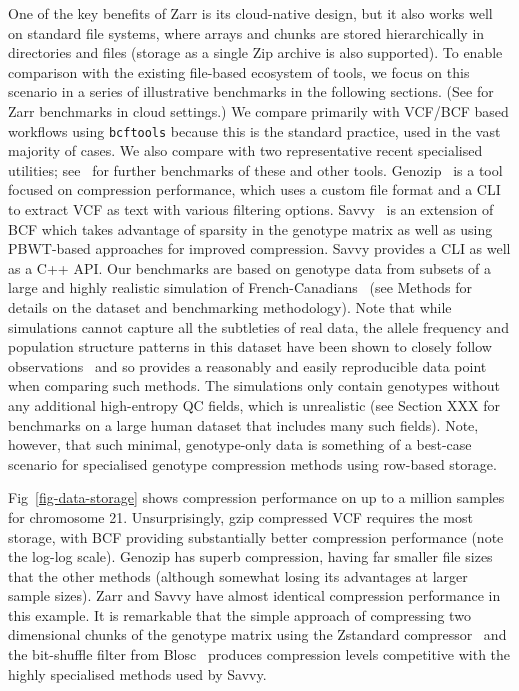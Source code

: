 \documentclass[a4paper,num-refs]{oup-contemporary}
\begin{document}
One of the key benefits of Zarr is its cloud-native design, 
but it also works well on standard file systems, where 
arrays and chunks are stored hierarchically in directories
and files (storage as a single Zip archive is also supported).
To enable comparison with the existing file-based ecosystem
of tools, we focus on this scenario in a series of illustrative 
benchmarks in the following sections. 
(See \citep{durbin2020task,moore2021ome,gowan2022using} for Zarr
benchmarks in cloud settings.)
We compare primarily with
VCF/BCF based workflows using \texttt{bcftools} because this
is the standard practice, used in the vast majority of cases.
We also compare with two representative recent specialised utilities;
see~\cite{danek2018gtc,zhang2023gbc} for further benchmarks of 
these and other tools.
Genozip~\cite{lan2020genozip,lan2021genozip} is a tool focused 
on compression performance, which uses a custom file format 
and a CLI to extract VCF as text with various filtering options.
Savvy~\cite{lefaive2021sparse} is an extension of BCF which 
takes advantage of sparsity in the genotype matrix as well
as using PBWT-based approaches for improved compression.
Savvy provides a CLI as well as a C++ API.
Our benchmarks are based on genotype data 
from subsets of a large and highly realistic 
simulation of French-Canadians~\cite{anderson2023on}
(see Methods for details on the dataset and benchmarking methodology).
Note that while simulations cannot capture 
all the subtleties of real data, the allele frequency
and population structure patterns in this dataset 
have been shown to closely follow 
observations~\cite{anderson2023on} and so provides 
a reasonably and easily reproducible data point 
when comparing such methods.
The simulations only contain genotypes without any additional
high-entropy QC fields, which is unrealistic (see Section XXX
for benchmarks on a large human dataset that includes 
many such fields). 
Note, however, that such minimal, genotype-only data 
is something of a best-case scenario for specialised genotype
compression methods using row-based storage.

Fig~\ref{fig-data-storage} shows compression performance 
on up to a million samples for chromosome 21.
Unsurprisingly, gzip compressed VCF requires the most 
storage, with BCF providing substantially better compression
performance (note the log-log scale). Genozip has 
superb compression, having far smaller file sizes that the 
other methods (although somewhat losing its advantages at 
larger sample sizes). Zarr and Savvy have 
almost identical compression performance in this example.
It is remarkable that the simple approach of compressing
two dimensional chunks of the genotype matrix 
using the Zstandard compressor~\citep{collet2021rfc} and the 
bit-shuffle filter from Blosc~\cite{alted2010modern} produces 
compression levels competitive with the highly specialised methods
used by Savvy.
\end{document}
